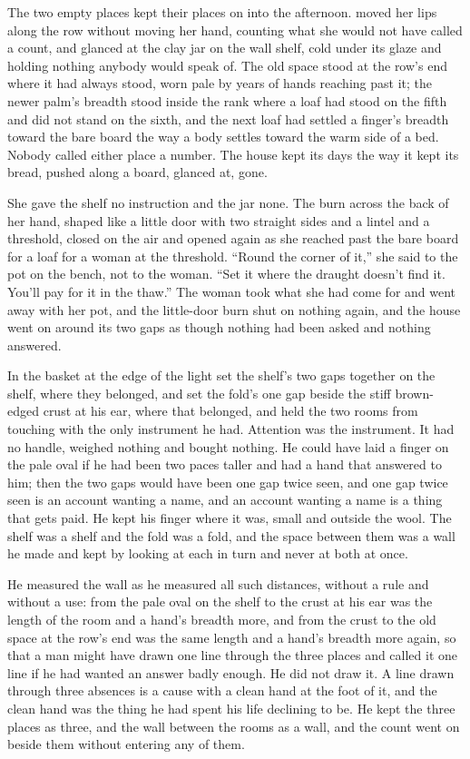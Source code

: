 The two empty places kept their places on  into the afternoon.  moved her lips along the row without moving her hand, counting what she would not have called a count, and glanced at the clay jar on the wall shelf, cold under its glaze and holding nothing anybody would speak of. The old space stood at the row's end where it had always stood, worn pale by years of hands reaching past it; the newer palm's breadth stood inside the rank where a loaf had stood on the fifth and did not stand on the sixth, and the next loaf had settled a finger's breadth toward the bare board the way a body settles toward the warm side of a bed. Nobody called either place a number. The house kept its days the way it kept its bread, pushed along a board, glanced at, gone.

She gave the shelf no instruction and the jar none. The burn across the back of her hand, shaped like a little door with two straight sides and a lintel and a threshold, closed on the air and opened again as she reached past the bare board for a loaf for a woman at the threshold. “Round the corner of it,” she said to the pot on the bench, not to the woman. “Set it where the draught doesn't find it. You'll pay for it in the thaw.” The woman took what she had come for and went away with her pot, and the little-door burn shut on nothing again, and the house went on around its two gaps as though nothing had been asked and nothing answered.

In the basket at the edge of the light  set the shelf's two gaps together on the shelf, where they belonged, and set the fold's one gap beside the stiff brown-edged crust at his ear, where that belonged, and held the two rooms from touching with the only instrument he had. Attention was the instrument. It had no handle, weighed nothing and bought nothing. He could have laid a finger on the pale oval if he had been two paces taller and had a hand that answered to him; then the two gaps would have been one gap twice seen, and one gap twice seen is an account wanting a name, and an account wanting a name is a thing that gets paid. He kept his finger where it was, small and outside the wool. The shelf was a shelf and the fold was a fold, and the space between them was a wall he made and kept by looking at each in turn and never at both at once.

He measured the wall as he measured all such distances, without a rule and without a use: from the pale oval on the shelf to the crust at his ear was the length of the room and a hand's breadth more, and from the crust to the old space at the row's end was the same length and a hand's breadth more again, so that a man might have drawn one line through the three places and called it one line if he had wanted an answer badly enough. He did not draw it. A line drawn through three absences is a cause with a clean hand at the foot of it, and the clean hand was the thing he had spent his life declining to be. He kept the three places as three, and the wall between the rooms as a wall, and the count went on beside them without entering any of them.

